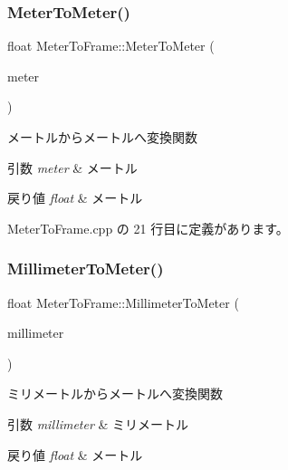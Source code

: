\subsubsection{\texorpdfstring{Meter\+To\+Meter()}{MeterToMeter()}}
{\footnotesize\ttfamily float Meter\+To\+Frame\+::\+Meter\+To\+Meter (\begin{DoxyParamCaption}\item[{float}]{meter }\end{DoxyParamCaption})\hspace{0.3cm}{\ttfamily [static]}}



メートルからメートルへ変換関数 


\begin{DoxyParams}{引数}
{\em meter} & メートル \\
\hline
\end{DoxyParams}

\begin{DoxyRetVals}{戻り値}
{\em float} & メートル \\
\hline
\end{DoxyRetVals}


 Meter\+To\+Frame.\+cpp の 21 行目に定義があります。

\mbox{\label{class_meter_to_frame_a1f02720bec5d07772fcacc214dbe7b59}} 
\subsubsection{\texorpdfstring{Millimeter\+To\+Meter()}{MillimeterToMeter()}}
{\footnotesize\ttfamily float Meter\+To\+Frame\+::\+Millimeter\+To\+Meter (\begin{DoxyParamCaption}\item[{float}]{millimeter }\end{DoxyParamCaption})\hspace{0.3cm}{\ttfamily [static]}}



ミリメートルからメートルへ変換関数 


\begin{DoxyParams}{引数}
{\em millimeter} & ミリメートル \\
\hline
\end{DoxyParams}

\begin{DoxyRetVals}{戻り値}
{\em float} & メートル \\
\hline
\end{DoxyRetVals}


